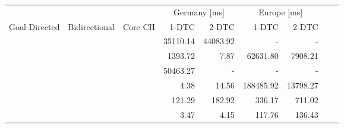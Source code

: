\begin{tabular}{cccrrrrrr}
	\toprule
	              &               &         & \multicolumn{2}{c}{Germany [\si{\milli\second}]} & \multicolumn{2}{c}{Europe [\si{\milli\second}]}                 \\
	Goal-Directed & Bidirectional & Core CH & 1-DTC                                            & 2-DTC                                           & 1-DTC & 2-DTC \\
	\midrule
	\xmark        & \xmark        & \xmark  & 35110.14                                                & 44083.92                                               & -     & -     \\
	\cmark        & \xmark        & \xmark  & 1393.72                                                & 7.87                                               & 62631.80     & 7908.21     \\
	\xmark        & \cmark        & \xmark  & 50463.27                                                & -                                               & -     & -     \\
	\cmark        & \cmark        & \xmark  & 4.38                                                & 14.56                                               & 188485.92     & 13798.27     \\
	\xmark        & \cmark        & \cmark  & 121.29                                                & 182.92                                               & 336.17     & 711.02     \\
	\cmark        & \cmark        & \cmark  & 3.47                                                & 4.15                                               & 117.76     & 136.43     \\
	\bottomrule
\end{tabular}